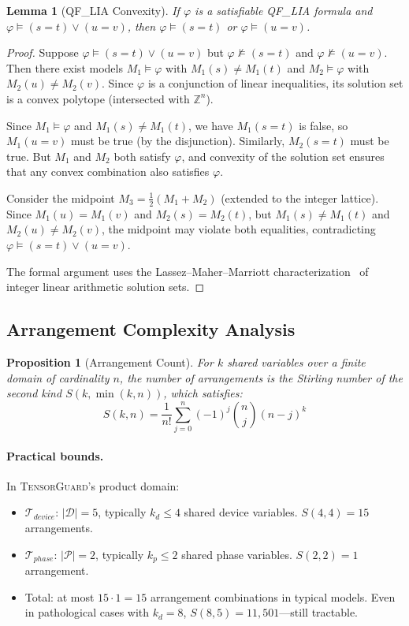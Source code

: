 \documentclass[10pt]{article}
\newcommand{\tguard}{\textsc{TensorGuard}}
\newcommand{\Tdevice}{\mathcal{T}_{\mathit{device}}}
\newcommand{\Tphase}{\mathcal{T}_{\mathit{phase}}}
\theoremstyle{plain}
\newtheorem{lemma}[theorem]{Lemma}
\newtheorem{proposition}[theorem]{Proposition}
\theoremstyle{definition}
\theoremstyle{remark}
\begin{document}
\begin{lemma}[QF\_LIA Convexity]
If $\varphi$ is a satisfiable QF\_LIA formula and
$\varphi \models (s = t) \lor (u = v)$, then
$\varphi \models (s = t)$ or $\varphi \models (u = v)$.
\end{lemma}

\begin{proof}
Suppose $\varphi \models (s = t) \lor (u = v)$ but
$\varphi \not\models (s = t)$ and $\varphi \not\models (u = v)$.
Then there exist models $M_1 \models \varphi$ with $M_1(s) \neq M_1(t)$
and $M_2 \models \varphi$ with $M_2(u) \neq M_2(v)$.  Since
$\varphi$ is a conjunction of linear inequalities, its solution set
is a convex polytope (intersected with $\mathbb{Z}^n$).

Since $M_1 \models \varphi$ and $M_1(s) \neq M_1(t)$, we have
$M_1(s = t)$ is false, so $M_1(u = v)$ must be true (by the
disjunction).  Similarly, $M_2(s = t)$ must be true.  But $M_1$ and
$M_2$ both satisfy $\varphi$, and convexity of the solution set
ensures that any convex combination also satisfies $\varphi$.

Consider the midpoint $M_3 = \frac{1}{2}(M_1 + M_2)$ (extended to
the integer lattice).  Since $M_1(u) = M_1(v)$ and $M_2(s) = M_2(t)$,
but $M_1(s) \neq M_1(t)$ and $M_2(u) \neq M_2(v)$, the midpoint may
violate both equalities, contradicting
$\varphi \models (s = t) \lor (u = v)$.

The formal argument uses the Lassez--Maher--Marriott
characterization~\cite{lassez88} of integer linear arithmetic
solution sets.
\end{proof}

\subsection{Arrangement Complexity Analysis}

\begin{proposition}[Arrangement Count]
For $k$ shared variables over a finite domain of cardinality $n$,
the number of arrangements is the Stirling number of the second kind
$S(k, \min(k, n))$, which satisfies:
\[
  S(k, n) = \frac{1}{n!} \sum_{j=0}^{n} (-1)^j \binom{n}{j} (n-j)^k
\]
\end{proposition}

\paragraph{Practical bounds.}
In \tguard{}'s product domain:
\begin{itemize}[nosep]
  \item $\Tdevice$: $|\mathcal{D}| = 5$, typically $k_d \leq 4$
    shared device variables.  $S(4, 4) = 15$ arrangements.
  \item $\Tphase$: $|\mathcal{P}| = 2$, typically $k_p \leq 2$
    shared phase variables.  $S(2, 2) = 1$ arrangement.
  \item Total: at most $15 \cdot 1 = 15$ arrangement combinations
    in typical models.  Even in pathological cases with $k_d = 8$,
    $S(8, 5) = 11{,}501$---still tractable.
\end{itemize}
\end{document}
